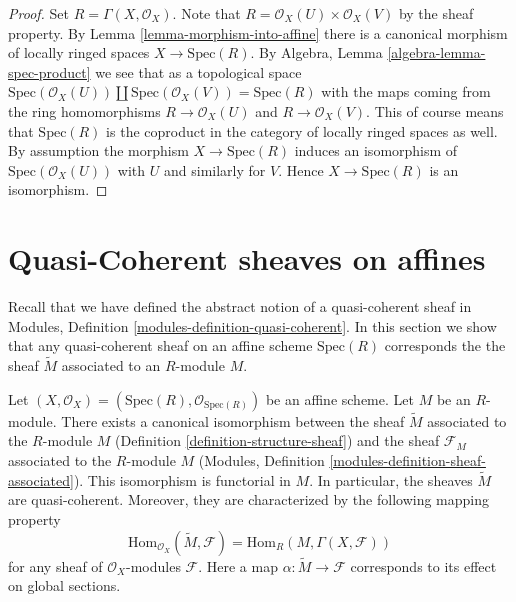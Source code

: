 \begin{proof}
Set $R = \Gamma(X, \mathcal{O}_X)$.
Note that $R = \mathcal{O}_X(U) \times \mathcal{O}_X(V)$
by the sheaf property. By Lemma \ref{lemma-morphism-into-affine}
there is a canonical morphism of locally ringed spaces
$X \to \text{Spec}(R)$. By Algebra, Lemma \ref{algebra-lemma-spec-product}
we see that as a topological space
$\text{Spec}(\mathcal{O}_X(U)) \amalg \text{Spec}(\mathcal{O}_X(V)) =
\text{Spec}(R)$
with the maps coming from the ring homomorphisms
$R \to \mathcal{O}_X(U)$ and $R \to \mathcal{O}_X(V)$.
This of course means that $\text{Spec}(R)$ is the coproduct
in the category of locally ringed spaces as well.
By assumption the morphism $X \to \text{Spec}(R)$ induces an isomorphism
of $\text{Spec}(\mathcal{O}_X(U))$ with $U$ and similarly
for $V$. Hence $X \to \text{Spec}(R)$ is an isomorphism.
\end{proof}















\section{Quasi-Coherent sheaves on affines}
\label{section-quasi-coherent-affine}

\noindent
Recall that we have defined the abstract notion of a quasi-coherent
sheaf in Modules, Definition \ref{modules-definition-quasi-coherent}.
In this section we show that any quasi-coherent sheaf on an affine
scheme $\text{Spec}(R)$ corresponds the the sheaf $\widetilde M$ associated to
an $R$-module $M$.

\begin{lemma}
\label{lemma-compare-constructions}
Let $(X, \mathcal{O}_X) = (\text{Spec}(R), \mathcal{O}_{\text{Spec}(R)})$
be an affine scheme. Let $M$ be an $R$-module. There exists a canonical
isomorphism between the sheaf $\widetilde M$ associated to the $R$-module
$M$ (Definition \ref{definition-structure-sheaf}) and the sheaf
$\mathcal{F}_M$ associated to the $R$-module $M$
(Modules, Definition \ref{modules-definition-sheaf-associated}).
This isomorphism is functorial in $M$. In particular,
the sheaves $\widetilde M$ are quasi-coherent. Moreover, they
are characterized by the following mapping property
$$
\text{Hom}_{\mathcal{O}_X}(\widetilde M, \mathcal{F})
=
\text{Hom}_R(M, \Gamma(X, \mathcal{F}))
$$
for any sheaf of $\mathcal{O}_X$-modules $\mathcal{F}$.
Here a map $\alpha : \widetilde M \to \mathcal{F}$ corresponds
to its effect on global sections.
\end{lemma}

